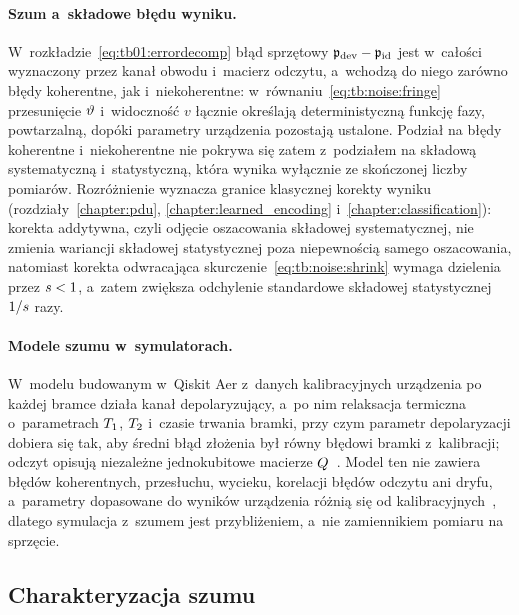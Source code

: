 \paragraph{Szum a~składowe błędu wyniku.}
W~rozkładzie~\eqref{eq:tb01:errordecomp} błąd sprzętowy $\mathfrak{p}_{\mathrm{dev}}-\mathfrak{p}_{\mathrm{id}}$ jest w~całości wyznaczony przez kanał obwodu i~macierz odczytu, a~wchodzą do niego zarówno błędy koherentne, jak i~niekoherentne: w~równaniu~\eqref{eq:tb:noise:fringe} przesunięcie $\vartheta$ i~widoczność $v$ łącznie określają deterministyczną funkcję fazy, powtarzalną, dopóki parametry urządzenia pozostają ustalone.
Podział na błędy koherentne i~niekoherentne nie pokrywa się zatem z~podziałem na składową systematyczną i~statystyczną, która wynika wyłącznie ze skończonej liczby pomiarów.
Rozróżnienie wyznacza granice klasycznej korekty wyniku (rozdziały~\ref{chapter:pdu}, \ref{chapter:learned_encoding} i~\ref{chapter:classification}): korekta addytywna, czyli odjęcie oszacowania składowej systematycznej, nie zmienia wariancji składowej statystycznej poza niepewnością samego oszacowania, natomiast korekta odwracająca skurczenie~\eqref{eq:tb:noise:shrink} wymaga dzielenia przez $s<1$, a~zatem zwiększa odchylenie standardowe składowej statystycznej $1/s$ razy.

\paragraph{Modele szumu w~symulatorach.}
W~modelu budowanym w~Qiskit Aer z~danych kalibracyjnych urządzenia po każdej bramce działa kanał depolaryzujący, a~po nim relaksacja termiczna o~parametrach $T_1$, $T_2$ i~czasie trwania bramki, przy czym parametr depolaryzacji dobiera się tak, aby średni błąd złożenia był równy błędowi bramki z~kalibracji; odczyt opisują niezależne jednokubitowe macierze $Q$~\cite{qiskit_aer_noise_docs_2026}.
Model ten nie zawiera błędów koherentnych, przesłuchu, wycieku, korelacji błędów odczytu ani dryfu, a~parametry dopasowane do wyników urządzenia różnią się od kalibracyjnych~\cite{georgopoulos_modeling_2021}, dlatego symulacja z~szumem jest przybliżeniem, a~nie zamiennikiem pomiaru na sprzęcie.

\subsection{Charakteryzacja szumu}\label{subsec:tb:noise:characterisation}

